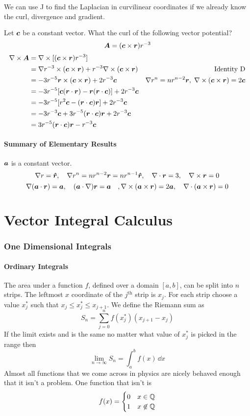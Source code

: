 \documentclass{article}
\begin{document}
    We can use J to find the Laplacian in curvilinear coordinates if we already know the curl, divergence and gradient.
    
    \example
    Let \(\bm{c}\) be a constant vector.
    What the curl of the following vector potential?
    \[\bm{A} = (\bm{c}\times\bm{r})r^{-3}\]
    \begin{align*}
        \nabla\times \bm{A} &= \nabla\times[(\bm{c}\times\bm{r})r^{-3}]\\
        &= \nabla r^{-3} \times (\bm{c}\times\bm{r}) + r^{-3}\nabla\times(\bm{c}\times\bm{r}) &\text{Identity D}\\
        &= -3r^{-5}\bm{r}\times(\bm{c}\times\bm{r}) + 2r^{-3}\bm{c} &\nabla r^n = nr^{n-2}\bm{r},\;\nabla\times(\bm{c}\times\bm{r}) = 2\bm{c}\\
        &= -3r^{-5}[\bm{c}(\bm{r}\cdot\bm{r}) - \bm{r}(\bm{r}\cdot \bm{c})] + 2r^{-3}\bm{c}\\
        &= -3r^{-5}[r^2\bm{c} - (\bm{r}\cdot\bm{c})\bm{r}] + 2r^{-3}\bm{c}\\
        &= -3r^{-3}\bm{c} + 3r^{-5}(\bm{r}\cdot\bm{c})\bm{r} + 2r^{-3}\bm{c}\\
        &= 3r^{-5}(\bm{r}\cdot\bm{c})\bm{r} - r^{-3}\bm{c}
    \end{align*}
    
    \subsection{Summary of Elementary Results}
    \(\bm{a}\) is a constant vector.
    \[\nabla r = \bm{\hat{r}},\quad \nabla r^n = nr^{n-2}\bm{r} = nr^{n-1}\bm{\hat{r}},\quad \nabla\cdot\bm{r} = 3,\quad \nabla\times\bm{r} = 0\]
    \[\nabla(\bm{a}\cdot\bm{r}) = \bm{a},\quad (\bm{a}\cdot\nabla)\bm{r} = \bm{a}\quad, \nabla\times(\bm{a}\times\bm{r}) = 2\bm{a},\quad \nabla\cdot(\bm{a}\times\bm{r}) = 0\]
    
    \part{Vector Integral Calculus}
    \section{One Dimensional Integrals}
    \subsection{Ordinary Integrals}
    The area under a function \(f\), defined over a domain \([a, b]\), can be split into \(n\) strips.
    The leftmost \(x\) coordinate of the \(j^\text{th}\) strip is \(x_j\).
    For each strip choose a value \(x_j^*\) such that \(x_j \le x_j^* \le x_{j + 1}\).
    We define the Riemann sum as
    \[S_n = \sum_{j=0}^{n}f(x_j^*)(x_{j + 1} - x_j)\]
    If the limit exists and is the same no matter what value of \(x_j^*\) is picked in the range then
    \[\lim_{n\to\infty} S_n = \int_a^bf(x)\,\dd x\]
    Almost all functions that we come across in physics are nicely behaved enough that it isn't a problem.
    One function that isn't is
    \[
        f(x) =
        \begin{cases}
            0 & x\in\mathbb{Q}\\
            1 & x\not\in \mathbb{Q}
        \end{cases}
    \]
    
\end{document}

